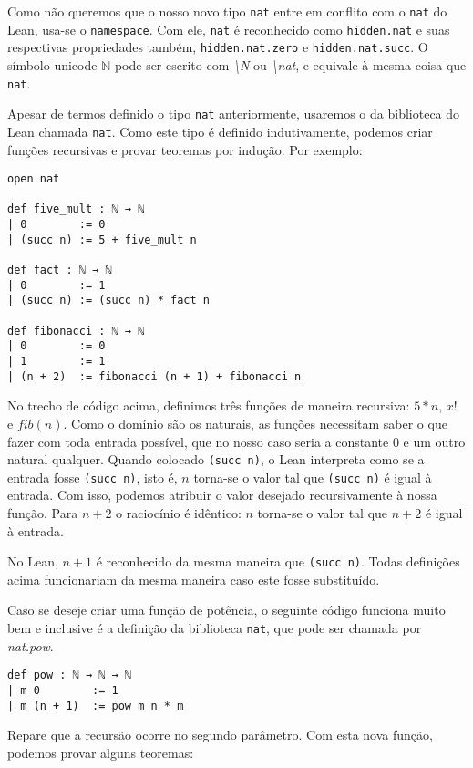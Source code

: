 Como não queremos que o nosso novo tipo \lstinline{nat} entre em conflito com o \lstinline{nat} do Lean, usa-se o \lstinline{namespace}. Com ele, \lstinline{nat} é reconhecido como \lstinline{hidden.nat} e suas respectivas propriedades também, \lstinline{hidden.nat.zero} e \lstinline{hidden.nat.succ}. O símbolo unicode $\mathbb{N}$ pode ser escrito com \textit{\textbackslash N} ou \textit{\textbackslash nat}, e equivale à mesma coisa que \lstinline{nat}.

Apesar de termos definido o tipo \lstinline{nat} anteriormente, usaremos o da biblioteca do Lean chamada \lstinline{nat}. Como este tipo é definido indutivamente, podemos criar funções recursivas e provar teoremas por indução. Por exemplo:

\begin{lstlisting}
open nat

def five_mult : ℕ → ℕ
| 0        := 0
| (succ n) := 5 + five_mult n

def fact : ℕ → ℕ
| 0        := 1
| (succ n) := (succ n) * fact n

def fibonacci : ℕ → ℕ
| 0        := 0
| 1        := 1
| (n + 2)  := fibonacci (n + 1) + fibonacci n
\end{lstlisting}

No trecho de código acima, definimos três funções de maneira recursiva: $5*n$, $x!$ e $fib(n)$. Como o domínio são os naturais, as funções necessitam saber o que fazer com toda entrada possível, que no nosso caso seria a constante $0$ e um outro natural qualquer. Quando colocado \lstinline{(succ n)}, o Lean interpreta como se a entrada fosse \lstinline{(succ n)}, isto é, $n$ torna-se o valor tal que \lstinline{(succ n)} é igual à entrada. Com isso, podemos atribuir o valor desejado recursivamente à nossa função. Para $n+2$ o raciocínio é idêntico: $n$ torna-se o valor tal que $n+2$ é igual à entrada.

No Lean, $n + 1$ é reconhecido da mesma maneira que \lstinline{(succ n)}. Todas definições acima funcionariam da mesma maneira caso este fosse substituído.

Caso se deseje criar uma função de potência, o seguinte código funciona muito bem e inclusive é a definição da biblioteca \lstinline{nat}, que pode ser chamada por \textit{nat.pow}.

\begin{lstlisting}
def pow : ℕ → ℕ → ℕ
| m 0        := 1
| m (n + 1)  := pow m n * m
\end{lstlisting}

Repare que a recursão ocorre no segundo parâmetro. Com esta nova função, podemos provar alguns teoremas:


